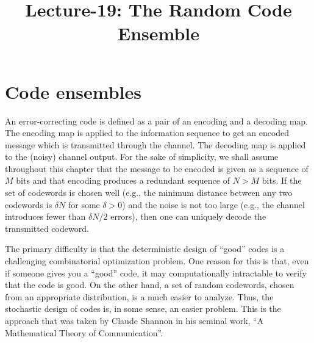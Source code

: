 \documentclass[letterpaper,english,10pt]{article}
\title{Lecture-19: The Random Code Ensemble}
\begin{document}
\maketitle

\section{Code ensembles}
An error-correcting code is defined as a pair of an encoding and a decoding map. 
The encoding map is applied to the information sequence to get an encoded message which is transmitted through the channel. 
The decoding map is applied to the (noisy) channel output. 
For the sake of simplicity, we shall assume throughout this chapter that the message to be encoded is given as a sequence of $M$ bits and that encoding produces a redundant sequence of $N > M$ bits. 
If the set of codewords is chosen well (e.g., the minimum distance between any two codewords is $\delta N$ for some $\delta > 0$) and the noise is not too large (e.g., the channel introduces fewer than $\delta  N/2$ errors), then one can uniquely decode the transmitted codeword.

The primary difficulty is that the deterministic design of ``good'' codes is a challenging combinatorial optimization problem. 
One reason for this is that, even if someone gives you a ``good'' code, it may computationally intractable to verify that the code is good. 
On the other hand, a set of random codewords, chosen from an appropriate distribution, is a much easier to analyze. 
Thus, the stochastic design of codes is, in some sense, an easier problem. 
This is the approach that was taken by Claude Shannon in his seminal work, ``A Mathematical Theory of Communication''. 
\end{document}
